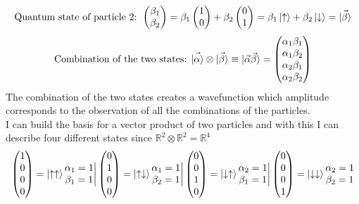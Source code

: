 \[\text{Quantum state of particle 2: } \begin{pmatrix}\beta_1\\\beta_2\end{pmatrix}=\beta_1\begin{pmatrix}1\\0\end{pmatrix}+\beta_2\begin{pmatrix}0\\1\end{pmatrix}=\beta_1\ket{\uparrow}+\beta_2\ket{\downarrow}=\vec{\ket{\beta}}\]
\[\text{Combination of the two states: }
\vec{\ket{\alpha}}\otimes\vec{\ket{\beta}}\equiv{\ket{\vec{\alpha}\vec{\beta}}}=\begin{pmatrix}\alpha_1\beta_1\\\alpha_1\beta_2\\\alpha_2\beta_1\\\alpha_2\beta_2\end{pmatrix}
\]
The combination of the two states creates a wavefunction which amplitude corresponds to the observation of all the combinations of the particles. \\
I can build the basis for a vector product of two particles and with this I can describe four different states since $\mathbb{R}^2\otimes\mathbb{R}^2=\mathbb{R}^4$
\[
\begin{pmatrix}1\\0\\0\\0\end{pmatrix}=\ket{\uparrow\uparrow}\begin{matrix}\alpha_1=1\\\beta_1=1\end{matrix}\bigg|
\begin{pmatrix}0\\1\\0\\0\end{pmatrix}=\ket{\uparrow\downarrow}\begin{matrix}\alpha_1=1\\\beta_2=1\end{matrix}\bigg|
\begin{pmatrix}0\\0\\1\\0\end{pmatrix}=\ket{\downarrow\uparrow}\begin{matrix}\alpha_2=1\\\beta_1=1\end{matrix}\bigg|
\begin{pmatrix}0\\0\\0\\1\end{pmatrix}=\ket{\downarrow\downarrow}\begin{matrix}\alpha_2=1\\\beta_2=1\end{matrix}
\]
